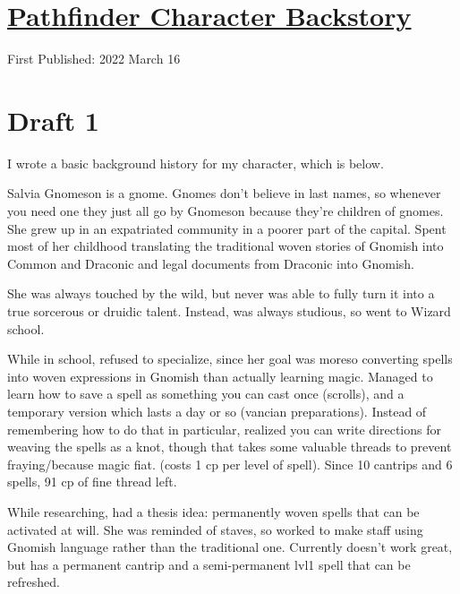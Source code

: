 \documentclass[12pt]{article}[titlepage]
\renewcommand{\,}{\textsuperscript{,}}
\begin{document}
\doublespacing
\section{\href{pathfinder-0-1.html}{Pathfinder Character Backstory}}
First Published: 2022 March 16

\section{Draft 1}
I wrote a basic background history for my character, which is below.

Salvia Gnomeson is a gnome.
Gnomes don't believe in last names, so whenever you need one they just all go by Gnomeson because they're children of gnomes.
She grew up in an expatriated community in a poorer part of the capital.
Spent most of her childhood translating the traditional woven stories of Gnomish into Common and Draconic and legal documents from Draconic into Gnomish.

She was always touched by the wild, but never was able to fully turn it into a true sorcerous or druidic talent.
Instead, was always studious, so went to Wizard school.

While in school, refused to specialize, since her goal was moreso converting spells into woven expressions in Gnomish than actually learning magic.
Managed to learn how to save a spell as something you can cast once (scrolls), and a temporary version which lasts a day or so (vancian preparations).
Instead of remembering how to do that in particular, realized you can write directions for weaving the spells as a knot, though that takes some valuable threads to prevent fraying/because magic fiat. (costs 1 cp per level of spell).
Since 10 cantrips and 6 spells, 91 cp of fine thread left.

While researching, had a thesis idea: permanently woven spells that can be activated at will.
She was reminded of staves, so worked to make staff using Gnomish language rather than the traditional one.
Currently doesn't work great, but has a permanent cantrip and a semi-permanent lvl1 spell that can be refreshed.
\end{document}
